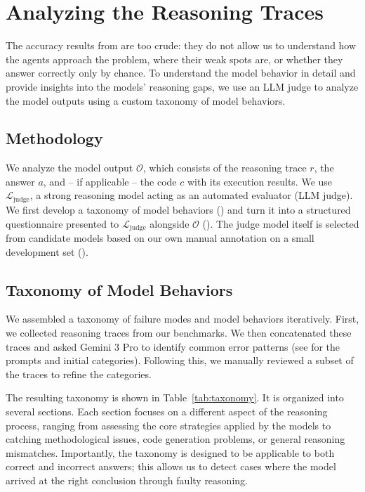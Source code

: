 \documentclass[11pt]{article}
\def\FR#1{{\color{orange!60!black!100}FR: \it #1}}
\newcommand{\ljudge}{$\mathcal{L}_{\text{judge}}$}
\begin{document}
%     


\section{Analyzing the Reasoning Traces}
\label{sec:analysis}


The accuracy results from  are too crude: they do not allow us to understand how the agents approach the problem, where their weak spots are, or whether they answer correctly only by chance. To understand the model behavior in detail and provide insights into the models' reasoning gaps, we use an LLM judge to analyze the model outputs using a custom taxonomy of model behaviors.

\subsection{Methodology}
We analyze the model output $\mathcal{O}$, which consists of the reasoning trace $r$, the answer $a$, and -- if applicable -- the code $c$ with its execution results. We use \ljudge{}, a strong reasoning model acting as an automated evaluator (LLM judge). We first develop a taxonomy of model behaviors () and turn it into a structured questionnaire presented to \ljudge{} alongside $\mathcal{O}$ (). The judge model itself is selected from candidate models based on our own manual annotation on a small development set ().

\subsection{Taxonomy of Model Behaviors}
\label{sec:taxonomy}

We assembled a taxonomy of failure modes and model behaviors iteratively. First, we collected reasoning traces from our benchmarks. We then concatenated these traces and asked Gemini 3 Pro to identify common error patterns (see  for the prompts and initial categories). Following this, we manually reviewed a subset of the traces to refine the categories. 

The resulting taxonomy is shown in Table~\ref{tab:taxonomy}. It is organized into several sections. Each section focuses on a different aspect of the reasoning process, ranging from assessing the core strategies applied by the models to catching methodological issues, code generation problems, or general reasoning mismatches. Importantly, the taxonomy is designed to be applicable to both correct and incorrect answers; this allows us to detect cases where the model arrived at the right conclusion through faulty reasoning.
\end{document}
